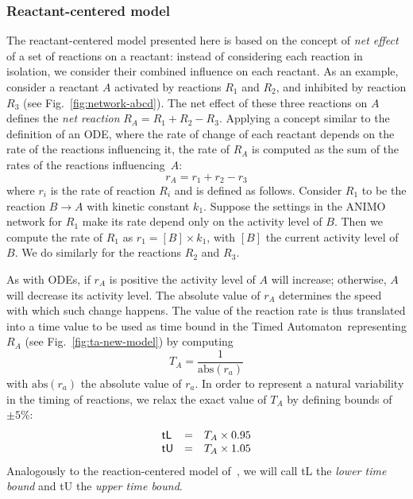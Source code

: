 \documentclass{bmcart}
\def\ta{Timed Automaton}
\def\tas{Timed Automata}
\begin{document}



\subsubsection*{Reactant-centered model}\label{sec:reactant-centered}
The reactant-centered model presented here is based on the concept of \emph{net effect} of a set of reactions on a reactant:
instead of considering each reaction in isolation, we consider their combined influence on each reactant.
As an example, consider a reactant $A$ activated by reactions $R_1$ and $R_2$, and inhibited
by reaction $R_3$ (see Fig.~\ref{fig:network-abcd}).
The net effect of these three reactions on $A$ defines the \emph{net reaction} $R_A = R_1 + R_2 - R_3.$
Applying a concept similar to the definition of an ODE,
where the rate of change of each reactant depends on the rate of the reactions influencing it,
the rate of $R_A$ is computed as the sum of the rates of the reactions influencing~$A$: 
$$r_A = r_1 + r_2 - r_3$$
where $r_i$ is the rate of reaction $R_i$ and is defined as follows.
Consider $R_1$ to be the reaction $B \rightarrow A$ with kinetic constant $k_1$.
Suppose the settings in the ANIMO network for $R_1$ make its rate depend only on the
activity level of $B$. Then we compute the rate of $R_1$ as $r_1 = [B] \times k_1$, with
$[B]$ the current activity level of $B$. We do similarly for the reactions $R_2$ and $R_3$.



As with ODEs, if $r_A$ is positive the activity level of $A$ will increase;
otherwise, $A$ will decrease its activity level.
The absolute value of $r_A$ determines the speed with which such change happens.
The value of the reaction rate is thus translated into a time value to be used as
time bound in the \ta\ representing $R_A$ (see Fig.~\ref{fig:ta-new-model}) by computing
$$T_A = \frac{1}{\mbox{abs}(r_a)}$$
with $\mbox{abs}(r_a)$ the absolute value of $r_a$. In order to represent
a natural variability in the timing of reactions, we relax the exact value of $T_A$ by
defining bounds of $\pm 5\%$:
$$
\begin{array}{lcl}
  \mbox{\sf tL} &=& T_A \times 0.95 \\
  \mbox{\sf tU} &=& T_A \times 1.05
\end{array}
$$
Analogously to the reaction-centered model of~\cite{animo-bibe},
we will call {\sf tL} the \emph{lower time bound} and {\sf tU} the \emph{upper time bound}.
\end{document}
